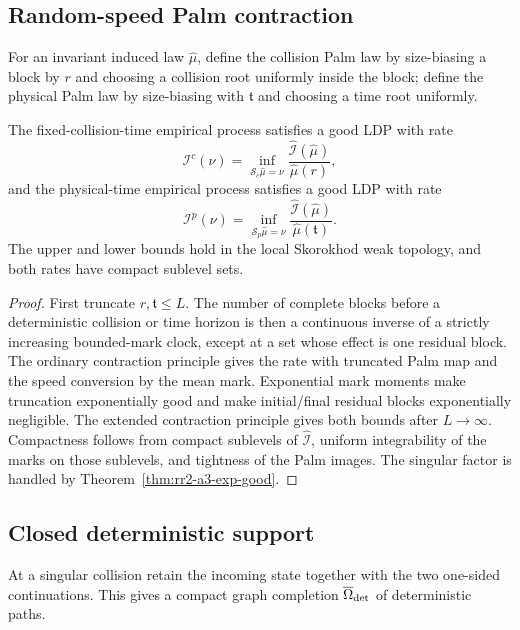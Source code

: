 \subsection{Random-speed Palm contraction}

For an invariant induced law \(\widehat\mu\), define the collision Palm law by
size-biasing a block by \(r\) and choosing a collision root uniformly inside
the block; define the physical Palm law by size-biasing with
\(\mathfrak t\) and choosing a time root uniformly.

\begin{theorem}
\label{thm:rr2-a3-palm}
The fixed-collision-time empirical process satisfies a good LDP with rate
\[
 \mathcal I^c(\nu)
 =
 \inf_{\mathscr S_c\widehat\mu=\nu}
 \frac{\widehat{\mathcal I}(\widehat\mu)}
      {\widehat\mu(r)} ,
\]
and the physical-time empirical process satisfies a good LDP with rate
\[
 \mathcal I^p(\nu)
 =
 \inf_{\mathscr S_p\widehat\mu=\nu}
 \frac{\widehat{\mathcal I}(\widehat\mu)}
      {\widehat\mu(\mathfrak t)} .
\]
The upper and lower bounds hold in the local Skorokhod weak topology, and
both rates have compact sublevel sets.
\end{theorem}

\begin{proof}
First truncate \(r,\mathfrak t\le L\).  The number of complete blocks before
a deterministic collision or time horizon is then a continuous inverse of a
strictly increasing bounded-mark clock, except at a set whose effect is one
residual block.  The ordinary contraction principle gives the rate with
truncated Palm map and the speed conversion by the mean mark.  Exponential
mark moments make truncation exponentially good and make initial/final
residual blocks exponentially negligible.  The extended contraction
principle gives both bounds after \(L\to\infty\).
Compactness follows from compact sublevels of \(\widehat{\mathcal I}\),
uniform integrability of the marks on those sublevels, and tightness of the
Palm images.  The singular factor is handled by
Theorem~\ref{thm:rr2-a3-exp-good}.
\end{proof}

\subsection{Closed deterministic support}

At a singular collision retain the incoming state together with the two
one-sided continuations.  This gives a compact graph completion
\(\overline\Omega_{\rm det}\) of deterministic paths.

